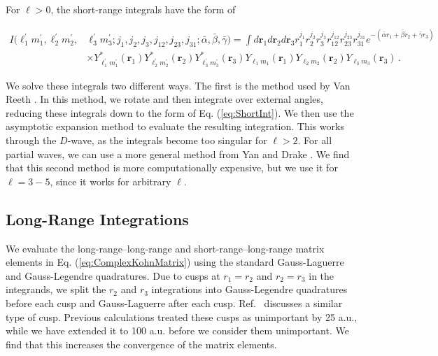 \documentclass[preprint,showpacs,showkeys,preprintnumbers,amsmath,amssymb,longbibliography,pra,aps]{revtex4-1}
\begin{document}
For $\ell > 0$, the short-range integrals have the form of
\begin{widetext}
\begin{align}
\label{eq:ShortIntGen}
\nonumber I(\ell_1^\prime m_1^\prime, \ell_2^\prime m_2^\prime, &\ell_3^\prime m_3^\prime; j_1,j_2,j_3,j_{12},j_{23},j_{31}; \bar{\alpha}, \bar{\beta}, \bar{\gamma}) = \int d \textbf{r}_1 d \textbf{r}_2 d \textbf{r}_3
r_1^{j_1} r_2^{j_2} r_3^{j_3} r_{12}^{j_{12}}
r_{23}^{j_{23}} r_{31}^{j_{31}}
e^{-(\bar{\alpha} r_1 + \bar{\beta} r_2 + \bar{\gamma} r_3)} \\
& \times Y_{\ell_1^\prime m_1^\prime}^* (\textbf{r}_1) Y_{\ell_2^\prime m_2^\prime}^* (\textbf{r}_2) Y_{\ell_3^\prime m_3^\prime}^* (\textbf{r}_3) Y_{\ell_1 m_1} (\textbf{r}_1) Y_{\ell_2 m_2} (\textbf{r}_2) Y_{\ell_3 m_3} (\textbf{r}_3)\, .
\end{align}
\end{widetext}
We solve these integrals two different ways.
The first is the method used by Van Reeth \cite{VanReethThesis}. In this 
method, we rotate and then integrate over external angles, reducing these 
integrals down to the form of Eq. (\ref{eq:ShortInt}). We then use the 
asymptotic expansion method \cite{Drake1995} to evaluate the resulting
integration. This works through the 
$D$-wave, as the integrals become too singular for $\ell > 2$. For all partial 
waves, we can use a more general method from Yan and Drake \cite{Yan1997}. 
We find that this second method is more computationally expensive, but we use 
it for $\ell = 3 - 5$, since it works for arbitrary $\ell$. 

\subsection{Long-Range Integrations}
\label{sec:LongInt}
We evaluate the long-range--long-range and short-range--long-range matrix 
elements in Eq. (\ref{eq:ComplexKohnMatrix}) using the standard Gauss-Laguerre
and Gauss-Legendre quadratures. Due to cusps at $r_1 = r_2$ and
$r_2 = r_3$ in the integrands, we split the $r_2$ and $r_3$ integrations into 
Gauss-Legendre quadratures before each cusp and Gauss-Laguerre after each cusp.
Ref.~\cite{Armour1991} discusses a similar type of cusp.
Previous calculations \cite{VanReeth2003,VanReeth2004} treated these cusps as 
unimportant by 25 a.u., while we have extended it to 100 a.u. before we consider 
them unimportant. We find that this increases the convergence of the matrix 
elements.
\end{document}
